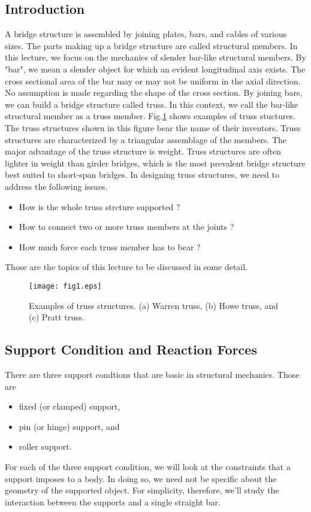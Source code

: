 \documentclass[10pt,a4j]{article}
\begin{document}
\subsection{Introduction}
A bridge structure is assembled by joining plates, bars, and cables of various sizes.
The parts making up a bridge structure are called structural members.
In this lecture, we focus on the mechanics of slender bar-like structural 
members. By "bar", we mean a slender object for which an evident longitudinal 
axis exists. The cross sectional area of the bar may or may not be uniform
in the axial direction. No assumption is made regarding the shape of the cross section.
By joining bars, we can build a bridge structure called truss. 
In this context, we call the bar-like structural member as a truss member. 
Fig.\ref{fig:fig1} shows examples of truss stuctures. 
The truss structures shown in this figure bear the name of their inventors. 
Truss structures are characterized by a triangular assemblage of the members. 
The major advantage of the truss structure is weight. 
Truss structures are often lighter in weight than girder bridges, which 
is the most prevalent bridge structure best suited to short-span bridges.
In designing truss structures, we need to address the following issues.
\begin{itemize}
\item
	How is the whole truss strcture supported ?
\item
	How to connect two or more truss members at the joints ?
\item
	How much force each truss member has to bear ?
\end{itemize}
Those are the topics of this lecture to be discussed in some detail. 
\begin{figure}[h]
	\begin{center}
	\texttt{[image: fig1.eps]} 
	\end{center}
	\caption{Examples of truss structures. (a) Warren truss, (b) Howe truss, and (c) Pratt truss.} 
	\label{fig:fig1}
\end{figure}
\subsection{Support Condition and Reaction Forces}
There are three support condtions that are basic in structural mechanics. 
Those are 
\begin{itemize}
\item
	fixed (or clamped) support,
\item
	pin (or hinge) support, and 
\item
	roller support.
\end{itemize}
For each of the three support condition, we will look at the constraints that a support 
imposes to a body. In doing so, we need not be specific about the geometry of the 
supported object. For simplicity, therefore, we'll study the interaction between 
the supports and a single straight bar. 
\end{document}
